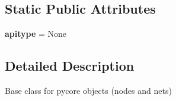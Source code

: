 \subsection*{Static Public Attributes}
\begin{DoxyCompactItemize}
\item 
\hypertarget{classcore_1_1coreobj_1_1_py_core_obj_a08c402484d370e201ed6ab3b09701d1c}{{\bfseries apitype} = None}\label{classcore_1_1coreobj_1_1_py_core_obj_a08c402484d370e201ed6ab3b09701d1c}

\end{DoxyCompactItemize}


\subsection{Detailed Description}
\begin{DoxyVerb}Base class for pycore objects (nodes and nets)
\end{DoxyVerb}
 

